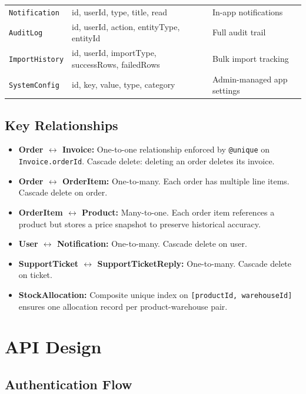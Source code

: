 ﻿\documentclass[12pt,a4paper]{report}
\newcommand{\model}[1]{\texttt{\color{accent}#1}}
\begin{document}
\begin{center}
\begin{longtable}{llp{7cm}}
  \model{Notification}    & id, userId, type, title, read & In-app notifications \\
  \model{AuditLog}        & id, userId, action, entityType, entityId & Full audit trail \\
  \model{ImportHistory}   & id, userId, importType, successRows, failedRows & Bulk import tracking \\
  \model{SystemConfig}    & id, key, value, type, category & Admin-managed app settings \\
  \bottomrule
\end{longtable}
\end{center}

\subsection{Key Relationships}

\begin{itemize}[leftmargin=1.5em]
  \item \textbf{Order $\leftrightarrow$ Invoice:} One-to-one relationship enforced by \texttt{@unique} on \texttt{Invoice.orderId}. Cascade delete: deleting an order deletes its invoice.
  \item \textbf{Order $\leftrightarrow$ OrderItem:} One-to-many. Each order has multiple line items. Cascade delete on order.
  \item \textbf{OrderItem $\leftrightarrow$ Product:} Many-to-one. Each order item references a product but stores a price snapshot to preserve historical accuracy.
  \item \textbf{User $\leftrightarrow$ Notification:} One-to-many. Cascade delete on user.
  \item \textbf{SupportTicket $\leftrightarrow$ SupportTicketReply:} One-to-many. Cascade delete on ticket.
  \item \textbf{StockAllocation:} Composite unique index on \texttt{[productId, warehouseId]} ensures one allocation record per product-warehouse pair.
\end{itemize}

\section{API Design}

\subsection{Authentication Flow}
\end{document}
